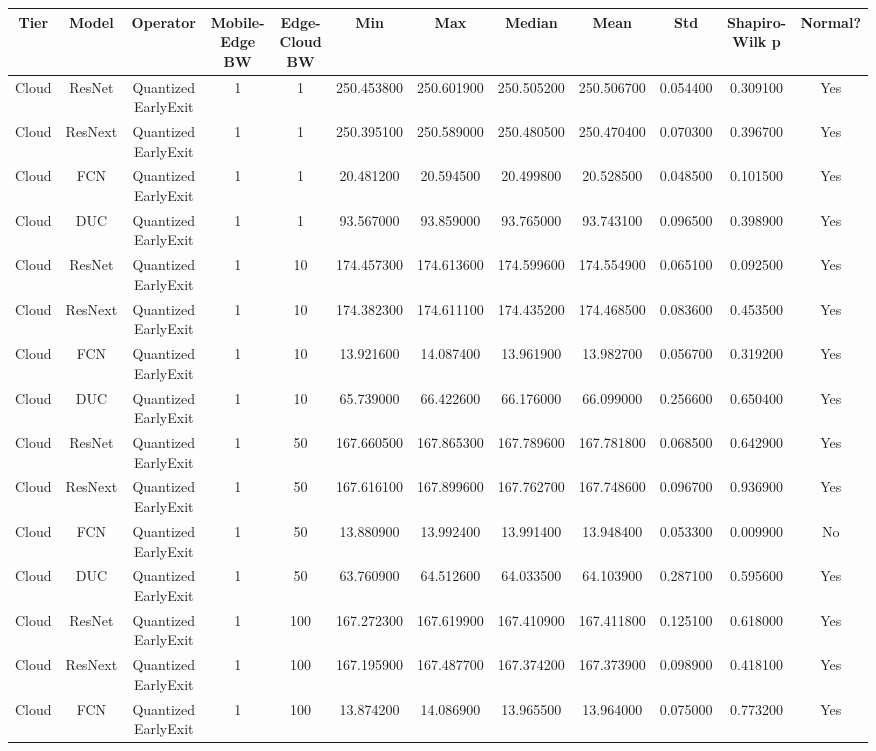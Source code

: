 \begin{tabular}{|c||c||c||c||c||c||c||c||c||c||c||c|}
\toprule
Tier & Model & Operator & Mobile-Edge BW & Edge-Cloud BW & Min & Max & Median & Mean & Std & Shapiro-Wilk p & Normal? \\
\midrule
Cloud & ResNet & Quantized EarlyExit & 1 & 1 & 250.453800 & 250.601900 & 250.505200 & 250.506700 & 0.054400 & 0.309100 & Yes \\
Cloud & ResNext & Quantized EarlyExit & 1 & 1 & 250.395100 & 250.589000 & 250.480500 & 250.470400 & 0.070300 & 0.396700 & Yes \\
Cloud & FCN & Quantized EarlyExit & 1 & 1 & 20.481200 & 20.594500 & 20.499800 & 20.528500 & 0.048500 & 0.101500 & Yes \\
Cloud & DUC & Quantized EarlyExit & 1 & 1 & 93.567000 & 93.859000 & 93.765000 & 93.743100 & 0.096500 & 0.398900 & Yes \\
Cloud & ResNet & Quantized EarlyExit & 1 & 10 & 174.457300 & 174.613600 & 174.599600 & 174.554900 & 0.065100 & 0.092500 & Yes \\
Cloud & ResNext & Quantized EarlyExit & 1 & 10 & 174.382300 & 174.611100 & 174.435200 & 174.468500 & 0.083600 & 0.453500 & Yes \\
Cloud & FCN & Quantized EarlyExit & 1 & 10 & 13.921600 & 14.087400 & 13.961900 & 13.982700 & 0.056700 & 0.319200 & Yes \\
Cloud & DUC & Quantized EarlyExit & 1 & 10 & 65.739000 & 66.422600 & 66.176000 & 66.099000 & 0.256600 & 0.650400 & Yes \\
Cloud & ResNet & Quantized EarlyExit & 1 & 50 & 167.660500 & 167.865300 & 167.789600 & 167.781800 & 0.068500 & 0.642900 & Yes \\
Cloud & ResNext & Quantized EarlyExit & 1 & 50 & 167.616100 & 167.899600 & 167.762700 & 167.748600 & 0.096700 & 0.936900 & Yes \\
Cloud & FCN & Quantized EarlyExit & 1 & 50 & 13.880900 & 13.992400 & 13.991400 & 13.948400 & 0.053300 & 0.009900 & No \\
Cloud & DUC & Quantized EarlyExit & 1 & 50 & 63.760900 & 64.512600 & 64.033500 & 64.103900 & 0.287100 & 0.595600 & Yes \\
Cloud & ResNet & Quantized EarlyExit & 1 & 100 & 167.272300 & 167.619900 & 167.410900 & 167.411800 & 0.125100 & 0.618000 & Yes \\
Cloud & ResNext & Quantized EarlyExit & 1 & 100 & 167.195900 & 167.487700 & 167.374200 & 167.373900 & 0.098900 & 0.418100 & Yes \\
Cloud & FCN & Quantized EarlyExit & 1 & 100 & 13.874200 & 14.086900 & 13.965500 & 13.964000 & 0.075000 & 0.773200 & Yes \\

\end{tabular}
